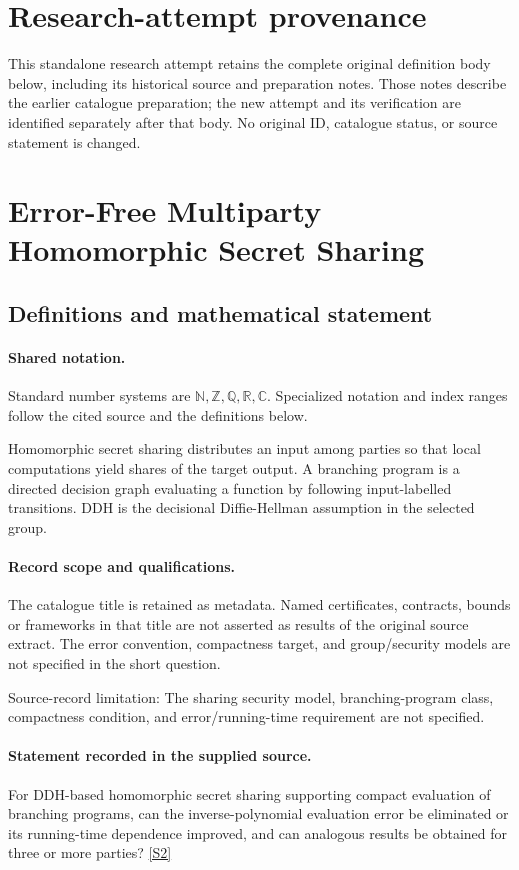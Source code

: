 \documentclass[11pt]{article}
\begin{document}
\section*{Research-attempt provenance}
This standalone research attempt retains the complete original definition body below,
including its historical source and preparation notes. Those notes describe the
earlier catalogue preparation; the new attempt and its verification are identified
separately after that body. No original ID, catalogue status, or source statement is changed.

\section{Error-Free Multiparty Homomorphic Secret Sharing}\label{statement}

\subsection{Definitions and mathematical statement}

\paragraph{Shared notation.}Standard number systems are $\mathbb N,\mathbb Z,\mathbb Q,\mathbb R,\mathbb C$. Specialized notation and index ranges follow the cited source and the definitions below.


Homomorphic secret sharing distributes an input among parties so that local computations yield shares of the target output. A branching program is a directed decision graph evaluating a function by following input-labelled transitions. DDH is the decisional Diffie-Hellman assumption in the selected group.
\paragraph{Record scope and qualifications.}
The catalogue title is retained as metadata. Named certificates, contracts, bounds or frameworks in that title are not asserted as results of the original source extract.
The error convention, compactness target, and group/security models are not specified in the short question.

Source-record limitation: The sharing security model, branching-program class, compactness condition, and error/running-time requirement are not specified.
\paragraph{Statement recorded in the supplied source.}
For DDH-based homomorphic secret sharing supporting compact evaluation of branching programs, can the inverse-polynomial evaluation error be eliminated or its running-time dependence improved, and can analogous results be obtained for three or more parties? \href{https://doi.org/10.4171/owr/2017/5}{[S2]}
\end{document}
